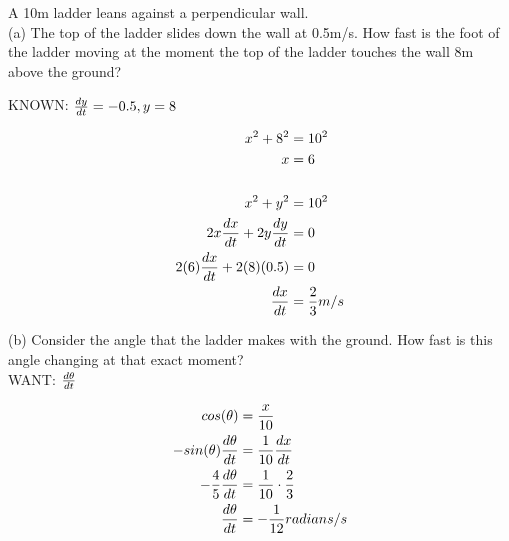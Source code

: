 \begin{exercise}\nonumber
    A 10m ladder leans against a perpendicular wall. \\

    (a) The top of the ladder slides down the wall at 0.5m/s. How fast is the foot of the ladder moving at the moment the top of the ladder touches the wall 8m above the ground? \\

    \begin{figure}[H]
        \centering
    \end{figure}

    KNOWN: $ {dy \over dt} = -0.5, y=8 $

    \begin{align}
        x^2 + 8^2                         & = 10^2           \\
        x                                 & = 6              \\
        \\
        x^2 + y^2                         & = 10^2           \\
        2x{dx \over dt} + 2y{dy \over dt} & = 0              \\
        2(6){dx \over dt} + 2(8)(0.5)     & = 0              \\
        {dx \over dt}                     & = {2 \over 3}m/s \\
    \end{align}

    (b) Consider the angle that the ladder makes with the ground. How fast is this angle changing at that exact moment? \\

    WANT: $ d\theta \over dt $

    \begin{align}
        cos(\theta)                    & = {x \over 10}                   \\
        -sin(\theta){d\theta \over dt} & = {1 \over 10}{dx \over dt}      \\
        -{4 \over 5}{d\theta \over dt} & = {1 \over 10} \cdot {2 \over 3} \\
        {d\theta \over dt}             & = -{1 \over 12}radians/s
    \end{align}
\end{exercise}

